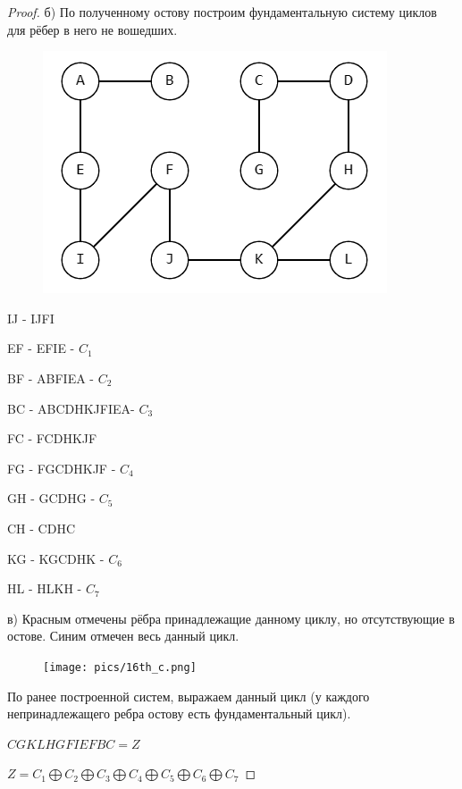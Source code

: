 \begin{proof}
    
    б) По полученному остову построим фундаментальную систему циклов для рёбер в него не вошедших.

    \begin{figure}[h]
    \centering
     \includegraphics[width=0.4\linewidth]{pics/16th_a_solution.png}
     \label{fig:dm}
    \end{figure}

    IJ - IJFI

    EF - EFIE - $C_1$

    BF - ABFIEA - $C_2$ 

    BC - ABCDHKJFIEA- $C_3$

    FC - FCDHKJF

    FG - FGCDHKJF - $C_4$

    GH - GCDHG - $C_5$

    CH - CDHC

    KG - KGCDHK - $C_6$

    HL - HLKH - $C_7$

    в) Красным отмечены рёбра принадлежащие данному циклу, но отсутствующие в остове. Синим отмечен весь данный цикл.

    \begin{figure}[h]
    \centering
     \texttt{[image: pics/16th\_с.png]}
     \label{fig:dm}
    \end{figure}

    По ранее построенной систем, выражаем данный цикл (у каждого непринадлежащего ребра остову есть фундаментальный цикл).
    
    $CGKLHGFIEFBC = Z$
    
    $Z = C_1\bigoplus C_2\bigoplus C_3\bigoplus C_4\bigoplus C_5\bigoplus C_6\bigoplus C_7$
    
\end{proof}